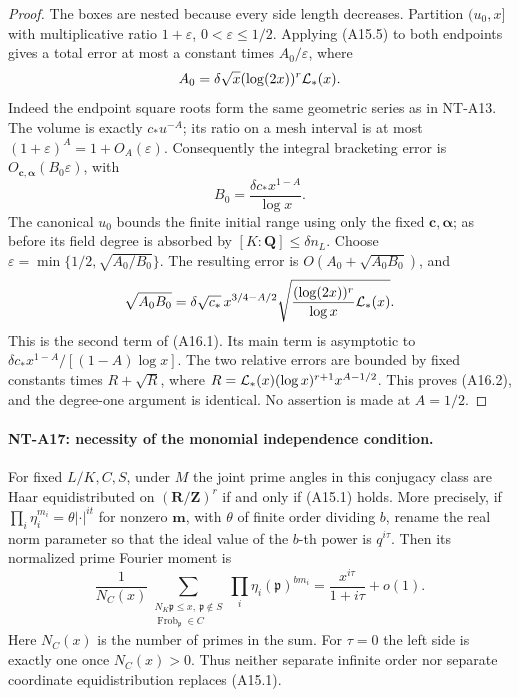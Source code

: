 \begin{proof}
The boxes are nested because every side length decreases.
Partition \((u_0,x]\) with multiplicative ratio
\(1+\varepsilon\), \(0<\varepsilon\le1/2\).
Applying (A15.5) to both endpoints gives a total error
at most a constant times \(A_0/\varepsilon\), where
\[
 A_0=\delta\sqrt x(\log(2x))^r{\cal L}_*(x).
 \]
Indeed the endpoint square roots form the same geometric
series as in NT-A13. The volume is exactly \(c_*u^{-A}\);
its ratio on a mesh interval is at most
\((1+\varepsilon)^A=1+O_A(\varepsilon)\).
Consequently the integral bracketing error is
\(O_{\mathbf c,\boldsymbol\alpha}(B_0\varepsilon)\), with
\[
                  B_0=\frac{\delta c_* x^{1-A}}{\log x}.
 \]
The canonical \(u_0\) bounds the finite initial range
using only the fixed \(\mathbf c,\boldsymbol\alpha\);
as before its field degree is absorbed by
\([K:\mathbf Q]\le\delta n_L\).
Choose \(\varepsilon=\min\{1/2,\sqrt{A_0/B_0}\}\).
The resulting error is \(O(A_0+\sqrt{A_0B_0})\), and
\[
 \sqrt{A_0B_0}
  =\delta\sqrt{c_*}\,x^{3/4-A/2}
          \sqrt{\frac{(\log(2x))^r}{\log x}{\cal L}_*(x)}.
 \]
This is the second term of (A16.1). Its main term is
asymptotic to
\(\delta c_*x^{1-A}/[(1-A)\log x]\).
The two relative errors are bounded by fixed constants
times \(R+\sqrt R\), where
\(R={\cal L}_*(x)(\log x)^{r+1}x^{A-1/2}\).
This proves (A16.2), and the degree-one argument is
identical. No assertion is made at \(A=1/2\).
\end{proof}

\paragraph{NT-A17: necessity of the monomial independence condition.}
For fixed \(L/K,C,S\), under \(M\) the joint prime angles
in this conjugacy class are Haar equidistributed on
\((\mathbf R/\mathbf Z)^r\) if and only if (A15.1) holds.
More precisely, if
\(\prod_i\eta_i^{m_i}=\theta|\cdot|^{it}\) for nonzero
\(\mathbf m\), with \(\theta\) of finite order dividing \(b\),
rename the real norm parameter so that the ideal value of
the \(b\)-th power is \(q^{i\tau}\). Then its normalized
prime Fourier moment is
\[
 \frac{1}{N_C(x)}
 \sum_{\substack{N_K\mathfrak p\le x,\ \mathfrak p\notin S\\
                  \operatorname{Frob}_{\mathfrak p}\in C}}
          \prod_i\eta_i(\mathfrak p)^{b m_i}
       =\frac{x^{i\tau}}{1+i\tau}+o(1).                  \tag{A17.1}
\]
Here \(N_C(x)\) is the number of primes in the sum.
For \(\tau=0\) the left side is exactly one once \(N_C(x)>0\).
Thus neither separate infinite order nor separate
coordinate equidistribution replaces (A15.1).

